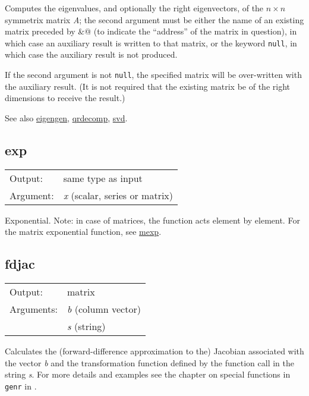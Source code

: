 	  Computes the eigenvalues, and optionally the right eigenvectors, of
	  the \ensuremath{n\times n} symmetrix matrix \textsl{A}; the
	  second argument must be either the name of an existing matrix
	  preceded by \verb@&@ (to indicate the ``address''
	  of the matrix in question), in which case an auxiliary result is
	  written to that matrix, or the keyword \texttt{null}, in which
	  case the auxiliary result is not produced.

	  If the second argument is not \texttt{null}, the specified
	  matrix will be over-written with the auxiliary result.  (It is
	  not required that the existing matrix be of the right dimensions
	  to receive the result.)

	  See also \hyperlink{func-eigengen}{eigengen}, \hyperlink{func-qrdecomp}{qrdecomp}, \hyperlink{func-svd}{svd}.

\subsection{exp}
\hypertarget{func-exp}{}

\begin{tabular}{ll}
Output:     & same type as input\\
Argument:   & \textsl{x} (scalar, series or matrix)\\
\end{tabular}

	  Exponential. Note: in case of matrices, the function acts element
	  by element. For the matrix exponential function, see \hyperlink{func-mexp}{mexp}.

\subsection{fdjac}
\hypertarget{func-fdjac}{}

\begin{tabular}{ll}
Output:     & matrix\\
Arguments:  & \textsl{b} (column vector)\\
           & \textsl{s} (string)\\
\end{tabular}

	  Calculates the (forward-difference approximation to the) Jacobian
	  associated with the vector \textsl{b} and the
	  transformation function defined by the function call in the string
	  \textsl{s}. For more details and examples see the chapter
	  on special functions in \texttt{genr} in 
	  \GUG{}.

